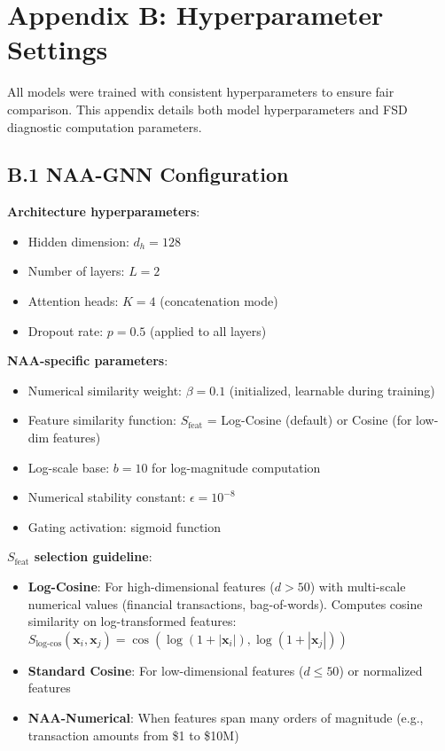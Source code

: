 \section*{Appendix B: Hyperparameter Settings}

All models were trained with consistent hyperparameters to ensure fair comparison. This appendix details both model hyperparameters and FSD diagnostic computation parameters.

\subsection*{B.1 NAA-GNN Configuration}

\textbf{Architecture hyperparameters}:
\begin{itemize}
\item Hidden dimension: $d_h = 128$
\item Number of layers: $L = 2$
\item Attention heads: $K = 4$ (concatenation mode)
\item Dropout rate: $p = 0.5$ (applied to all layers)
\end{itemize}

\textbf{NAA-specific parameters}:
\begin{itemize}
\item Numerical similarity weight: $\beta = 0.1$ (initialized, learnable during training)
\item Feature similarity function: $S_{\text{feat}}$ = Log-Cosine (default) or Cosine (for low-dim features)
\item Log-scale base: $b = 10$ for log-magnitude computation
\item Numerical stability constant: $\epsilon = 10^{-8}$
\item Gating activation: sigmoid function
\end{itemize}

\textbf{$S_{\text{feat}}$ selection guideline}:
\begin{itemize}
\item \textbf{Log-Cosine}: For high-dimensional features ($d > 50$) with multi-scale numerical values (financial transactions, bag-of-words). Computes cosine similarity on log-transformed features: $S_{\text{log-cos}}(\mathbf{x}_i, \mathbf{x}_j) = \cos(\log(1+|\mathbf{x}_i|), \log(1+|\mathbf{x}_j|))$
\item \textbf{Standard Cosine}: For low-dimensional features ($d \leq 50$) or normalized features
\item \textbf{NAA-Numerical}: When features span many orders of magnitude (e.g., transaction amounts from \$1 to \$10M)
\end{itemize}

